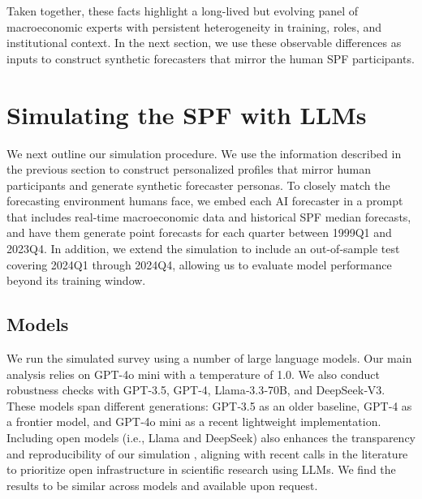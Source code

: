 \documentclass[11pt,letterpaper]{scrartcl}
\begin{document}
Taken together, these facts highlight a long-lived but evolving panel of macroeconomic experts with persistent heterogeneity in training, roles, and institutional context. In the next section, we use these observable differences as inputs to construct synthetic forecasters that mirror the human SPF participants.

\section{Simulating the SPF with LLMs}\label{sec:method}

We next outline our simulation procedure. We use the information described in the previous section to construct personalized profiles that mirror human participants and generate synthetic forecaster personas. To closely match the forecasting environment humans face, we embed each AI forecaster in a prompt that includes real-time macroeconomic data and historical SPF median forecasts, and have them generate point forecasts for each quarter between 1999Q1 and 2023Q4. In addition, we extend the simulation to include an out-of-sample test covering 2024Q1 through 2024Q4, allowing us to evaluate model performance beyond its training window.

\subsection{Models}
We run the simulated survey using a number of large language models. Our main analysis relies on GPT-4o mini with a temperature of 1.0. We also conduct robustness checks with GPT-3.5, GPT-4, Llama‑3.3‑70B, and DeepSeek‑V3. These models span different generations: GPT‑3.5 as an older baseline, GPT‑4 as a frontier model, and GPT‑4o mini as a recent lightweight implementation. Including open models (i.e., Llama and DeepSeek) also enhances the transparency and reproducibility of our simulation \citep[see, e.g., ][]{cook2023evaluating}, aligning with recent calls in the literature to prioritize open infrastructure in scientific research using LLMs. We find the results to be similar across models and available upon request.
\end{document}

